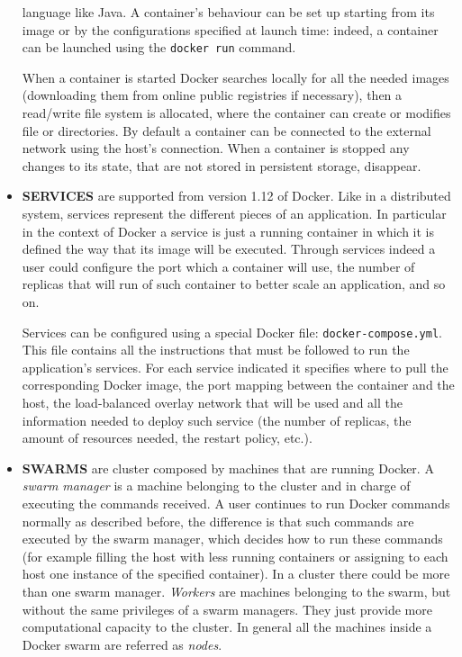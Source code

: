 \documentclass[a4paper,12pt]{article}
\newcommand{\file}[1]{\texttt{#1}\xspace}
\newcommand{\code}[1]{\lstinline|#1|}
\begin{document}
\begin{itemize}
  language like Java. A container's behaviour can be set up starting from its
  image or by the configurations specified at launch time: indeed, a container can be
  launched using the \code{docker run} command.\par When a container is started
  Docker searches locally for all the needed images (downloading them from
  online public registries if necessary), then a read/write file system is
  allocated, where the container can create or modifies file or directories.  By
  default a container can be connected to the external network using the host's
  connection. When a container is stopped  any changes to its state, that are
  not stored in persistent storage, disappear.
  \item \textbf{SERVICES} are supported from version 1.12 of Docker. Like in a
  distributed system, services represent the different pieces of an application.
  In particular in the context of Docker a service is just a running container
  in which it is defined the way that its image will be executed. Through
  services indeed a user could configure the port which a container will use,
  the number of replicas that will run of such container to better scale an
  application, and so on. \par Services can be configured using a special Docker
  file: \file{docker-compose.yml}. This file contains all the instructions that
  must be followed to run the application's services. For each service indicated
  it specifies where to pull the corresponding Docker image, the port mapping
  between the container and the host, the load-balanced overlay network that
  will be used and all the information needed to deploy such service (the number
  of replicas, the amount of resources needed, the restart policy, etc.).
  \item \textbf{SWARMS} are cluster composed by machines that are running
  Docker. A \textit{swarm manager} is a machine belonging to the cluster and in
  charge of executing the commands received. A user continues to run Docker
  commands normally as described before, the difference is that such commands
  are executed by the swarm manager, which decides how to run these commands
  (for example filling the host with less running containers or assigning to
  each host one instance of the specified container). In a cluster there could
  be more than one swarm manager. \textit{Workers} are machines belonging to the
  swarm, but without the same privileges of a swarm managers. They just provide
  more computational capacity to the cluster. In general all the machines inside
  a Docker swarm are referred as \textit{nodes}.
\end{itemize}
\end{document}
